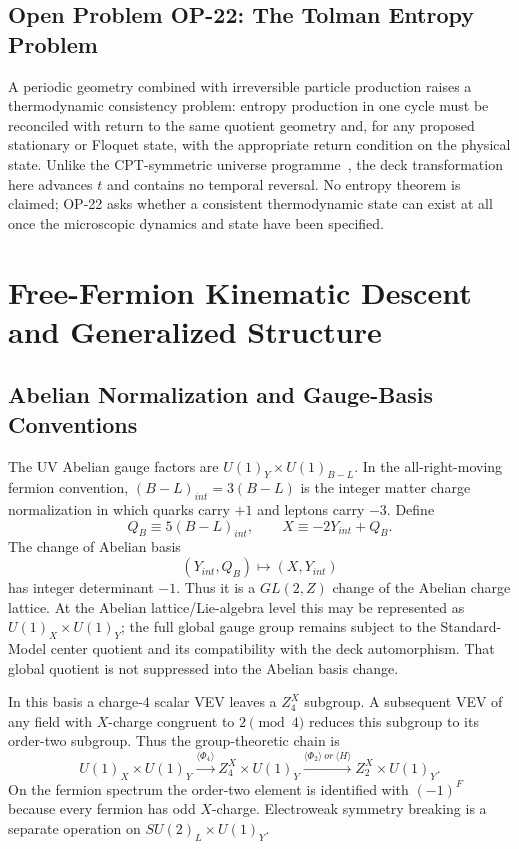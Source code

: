 \documentclass[11pt]{article}
\theoremstyle{canonmath}
\theoremstyle{canonpostulate}
\theoremstyle{canonclaim}
\def\mathrm#1{#1}%
\def\mathbb#1{#1}%
\begin{document}
\subsection{Open Problem OP-22: The Tolman Entropy Problem}

A periodic geometry combined with irreversible particle production raises a thermodynamic consistency problem: entropy production in one cycle must be reconciled with return to the same quotient geometry and, for any proposed stationary or Floquet state, with the appropriate return condition on the physical state. Unlike the CPT-symmetric universe programme~\cite{BoyleFinnTurok}, the deck transformation here advances $t$ and contains no temporal reversal. No entropy theorem is claimed; OP-22 asks whether a consistent thermodynamic state can exist at all once the microscopic dynamics and state have been specified.

\section{Free-Fermion Kinematic Descent and Generalized Structure}
\label{sec:fermion}

\subsection{Abelian Normalization and Gauge-Basis Conventions}

The UV Abelian gauge factors are $U(1)_Y\times U(1)_{B-L}$. In the all-right-moving fermion convention, $(B-L)_{\mathrm{int}}=3(B-L)$ is the integer matter charge normalization in which quarks carry $+1$ and leptons carry $-3$. Define
\begin{equation}
Q_B\equiv5(B-L)_{\mathrm{int}},
\qquad
X\equiv-2Y_{\mathrm{int}}+Q_B.
\end{equation}
The change of Abelian basis
\begin{equation}
(Y_{\mathrm{int}},Q_B)\mapsto(X,Y_{\mathrm{int}})
\end{equation}
has integer determinant $-1$. Thus it is a $GL(2,\mathbb Z)$ change of the Abelian charge lattice. At the Abelian lattice/Lie-algebra level this may be represented as $U(1)_X\times U(1)_Y$; the full global gauge group remains subject to the Standard-Model center quotient and its compatibility with the deck automorphism. That global quotient is not suppressed into the Abelian basis change.

In this basis a charge-$4$ scalar VEV leaves a $\mathbb Z_4^X$ subgroup. A subsequent VEV of any field with $X$-charge congruent to $2\pmod4$ reduces this subgroup to its order-two subgroup. Thus the group-theoretic chain is
\begin{equation}
U(1)_X\times U(1)_Y
\xrightarrow{\langle\Phi_4\rangle}
\mathbb Z_4^X\times U(1)_Y
\xrightarrow{\langle\Phi_2\rangle\ \mathrm{or}\ \langle H\rangle}
\mathbb Z_2^X\times U(1)_Y.
\end{equation}
On the fermion spectrum the order-two element is identified with $(-1)^F$ because every fermion has odd $X$-charge. Electroweak symmetry breaking is a separate operation on $SU(2)_L\times U(1)_Y$.
\end{document}
